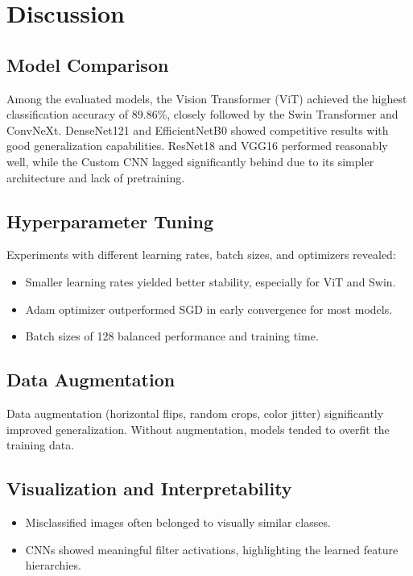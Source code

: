 \documentclass[11pt]{article}
\begin{document}
\section{Discussion}

\subsection*{Model Comparison}
Among the evaluated models, the Vision Transformer (ViT) achieved the highest classification accuracy of 89.86\%, closely followed by the Swin Transformer and ConvNeXt. DenseNet121 and EfficientNetB0 showed competitive results with good generalization capabilities. ResNet18 and VGG16 performed reasonably well, while the Custom CNN lagged significantly behind due to its simpler architecture and lack of pretraining.

\subsection*{Hyperparameter Tuning}
Experiments with different learning rates, batch sizes, and optimizers revealed:
\begin{itemize}
    \item Smaller learning rates yielded better stability, especially for ViT and Swin.
    \item Adam optimizer outperformed SGD in early convergence for most models.
    \item Batch sizes of 128 balanced performance and training time.
\end{itemize}

\subsection*{Data Augmentation}
Data augmentation (horizontal flips, random crops, color jitter) significantly improved generalization. Without augmentation, models tended to overfit the training data.

\subsection*{Visualization and Interpretability}
\begin{itemize}
    \item Misclassified images often belonged to visually similar classes.
    \item CNNs showed meaningful filter activations, highlighting the learned feature hierarchies.
\end{itemize}
\end{document}
